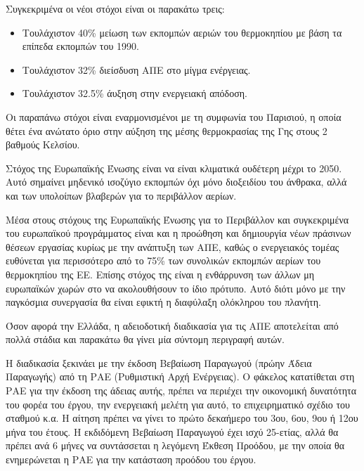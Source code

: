\documentclass[12pt]{report}
\begin{document}
Συγκεκριμένα οι νέοι στόχοι είναι οι παρακάτω τρεις:
\begin{itemize}
\item Τουλάχιστον 40\% μείωση των εκπομπών αεριών του θερμοκηπίου με βάση τα επίπεδα εκπομπών του 1990.
\item Τουλάχιστον 32\% διείσδυση ΑΠΕ στο μίγμα ενέργειας.
\item Τουλάχιστον 32.5\% άυξηση στην ενεργειακή απόδοση.
\end{itemize}

Οι παραπάνω στόχοι είναι εναρμονισμένοι με τη συμφωνία του Παρισιού, η οποία θέτει ένα ανώτατο όριο στην αύξηση της μέσης θερμοκρασίας της Γης στους 2 βαθμούς Κελσίου.

Στόχος της Ευρωπαϊκής Ένωσης είναι να είναι κλιματικά ουδέτερη μέχρι το 2050. Αυτό σημαίνει μηδενικό ισοζύγιο εκπομπών όχι μόνο διοξειδίου του άνθρακα, αλλά και των υπολοίπων βλαβερών για το περιβάλλον αερίων.

Μέσα στους στόχους της Ευρωπαϊκής Ένωσης για το Περιβάλλον και συγκεκριμένα του ευρωπαϊκού προγράμματος {} είναι και η προώθηση και δημιουργία νέων πράσινων θέσεων εργασίας κυρίως με την 
ανάπτυξη των ΑΠΕ, καθώς ο ενεργειακός τομέας ευθύνεται για περισσότερο από το 75\% των συνολικών εκπομπών αερίων του θερμοκηπίου της ΕΕ. Επίσης στόχος της είναι η 
ενθάρρυνση των άλλων μη ευρωπαϊκών χωρών στο να ακολουθήσουν το ίδιο πρότυπο. Αυτό διότι μόνο με την παγκόσμια συνεργασία θα είναι εφικτή η διαφύλαξη ολόκληρου του πλανήτη.

\begin{center}
\end{center}

Όσον αφορά την Ελλάδα, η αδειοδοτική διαδικασία για τις ΑΠΕ αποτελείται από πολλά στάδια και παρακάτω θα γίνει μία σύντομη περιγραφή αυτών.

Η διαδικασία ξεκινάει με την έκδοση Βεβαίωση Παραγωγού (πρώην Άδεια Παραγωγής) από τη ΡΑΕ (Ρυθμιστική Αρχή Ενέργειας). Ο φάκελος κατατίθεται στη ΡΑΕ για την έκδοση της άδειας αυτής, πρέπει να περιέχει την οικονομική δυνατότητα του 
φορέα του έργου, την ενεργειακή μελέτη για αυτό, το επιχειρηματικό σχέδιο του σταθμού κ.α. Η αίτηση πρέπει να γίνει το πρώτο δεκαήμερο του 3ου, 6ου, 9ου ή 12ου μήνα του έτους. Η εκδιδόμενη Βεβαίωση Παραγωγού έχει ισχύ 25-ετίας, 
αλλά θα πρέπει ανά 6 μήνες να συντάσσεται η λεγόμενη Έκθεση Προόδου, με την οποία θα ενημερώνεται η ΡΑΕ για την κατάσταση προόδου του έργου.
\end{document}
